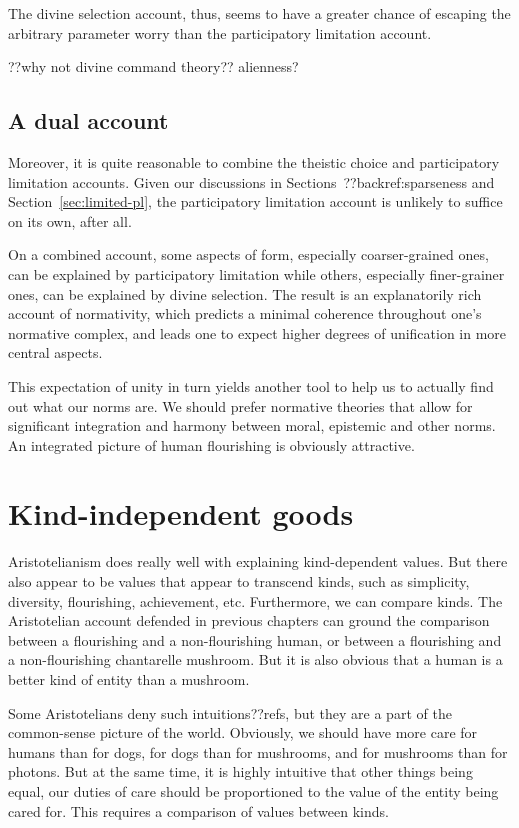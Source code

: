 The divine selection account, thus, seems to have a greater chance of escaping the arbitrary parameter worry than the 
participatory limitation account.

??why not divine command theory?? alienness?

\subsection{A dual account}
Moreover, it is quite reasonable to combine the theistic choice and participatory limitation accounts. Given our discussions in Sections~??backref:sparseness and Section~\ref{sec:limited-pl}, the participatory limitation account is unlikely to suffice on its own, after all.

On a combined account, some aspects of form, especially coarser-grained ones, can be explained by participatory 
limitation while others, especially finer-grainer ones, can be explained by divine selection. The result is an explanatorily rich account of 
normativity, which predicts a minimal coherence throughout one's normative complex, and leads one to expect higher degrees of unification
in more central aspects.

This expectation of unity in turn yields another tool to help us to actually find out what our norms are. We should prefer normative theories
that allow for significant integration and harmony between moral, epistemic and other norms. An integrated picture of human flourishing
is obviously attractive.

\section{Kind-independent goods}
Aristotelianism does really well with explaining kind-dependent values. But there also appear to be values that appear
to transcend kinds, such as simplicity, diversity, flourishing, achievement, etc. Furthermore, we can compare kinds.
The Aristotelian account defended in previous chapters can ground the comparison between a flourishing and a non-flourishing 
human, or between a flourishing and a non-flourishing chantarelle mushroom. But it is also obvious that a human is a better
kind of entity than a mushroom. 

Some Aristotelians deny such intuitions??refs, but they are a part of the common-sense picture of the world. 
Obviously, we should have more care for humans than for dogs,  for dogs than for mushrooms, and for 
mushrooms than for photons. But at the same time, it is highly intuitive that other things being equal, our 
duties of care should be proportioned to the value of the entity being cared for. This requires a comparison
of values between kinds. 


